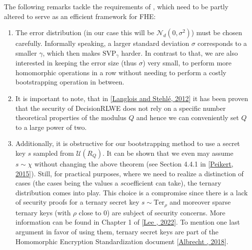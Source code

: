 \documentclass[letterpaper,10pt,english]{jupyterBook}
\begin{document}
\sphinxAtStartPar
The following remarks tackle the requirements of {\hyperref[\detokenize{Thesis:decision-RLWE}]{}}, which need to be partly altered to serve as an efficient framework for FHE:
\begin{enumerate}
%
\item {} 
\sphinxAtStartPar
The error distribution (in our case this will be \(\mathcal N_d(0,\sigma^2)\)) must be chosen carefully.
Informally speaking, a larger standard deviation \(\sigma\) corresponds to a smaller \(\gamma\), which then makes \(\mathrm{SVP}_\gamma\) harder.
In contrast to that, we are also interested in keeping the error size (thus \(\sigma\)) very small, to perform more homomorphic operations in a row without needing to perform a costly bootstrapping operation in between.

\item {} 
\sphinxAtStartPar
It is important to note, that in {[}\hyperlink{cite.Thesis:id66}{Langlois and Stehlé, 2012}{]} it has been proven that the security of Decision\sphinxhyphen{}RLWE does not rely on a specific number theoretical properties of the modulus \(Q\) and hence we can conveniently set \(Q\) to a large power of two.

\item {} 
\sphinxAtStartPar
Additionally, it is obstructive for our bootstrapping method to use a secret key \(s\) sampled from \(\mathcal U(R_Q)\).
It can be shown that we even may assume \(s \sim \chi\) without changing the above theorem (see Section 4.4.1 in {[}\hyperlink{cite.Thesis:id65}{Peikert, 2015}{]}).
Still, for practical purposes, where we need to realize a distinction of cases (the cases being the values a \(s\)\sphinxhyphen{}coefficient can take), the ternary distribution comes into play.
This choice is a compromise since there is a lack of security proofs for a ternary secret key \(s \sim \mathrm{Ter}_\rho\) and moreover sparse ternary keys (with \(\rho\) close to \(0\)) are subject of security concerns.
More information can be found in Chapter 1 of {[}\hyperlink{cite.Thesis:id67}{Lee , 2022}{]}.
To mention one last argument in favor of using them, ternary secret keys are part of the Homomorphic Encryption Standardization document {[}\hyperlink{cite.Thesis:id68}{Albrecht , 2018}{]}.

\end{enumerate}
\label{\detokenize{Thesis:the-bfv-scheme}}
\begin{DUlineblock}{0em}
\item[] 
\end{DUlineblock}
\end{document}
